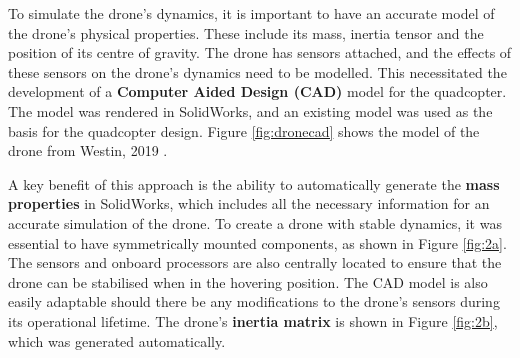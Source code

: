 To simulate the drone's dynamics, it is important to have an accurate model of the drone's physical properties. These include its mass, inertia tensor and the position of its centre of gravity. The drone has sensors attached, and the effects of these sensors on the drone's dynamics need to be modelled. This necessitated the development of a \textbf{Computer Aided Design (CAD)} model for the quadcopter. The model was rendered in SolidWorks, and an existing model was used as the basis for the quadcopter design. Figure \ref{fig:dronecad} shows the model of the drone from Westin, 2019 \cite{westin2019x4}. 

A key benefit of this approach is the ability to automatically generate the \textbf{mass properties} in SolidWorks, which includes all the necessary information for an accurate simulation of the drone. To create a drone with stable dynamics, it was essential to have symmetrically mounted components, as shown in Figure \ref{fig:2a}. The sensors and onboard processors are also centrally located to ensure that the drone can be stabilised when in the hovering position. The CAD model is also easily adaptable should there be any modifications to the drone's sensors during its operational lifetime. The drone's \textbf{inertia matrix} is shown in Figure \ref{fig:2b}, which was generated automatically.

